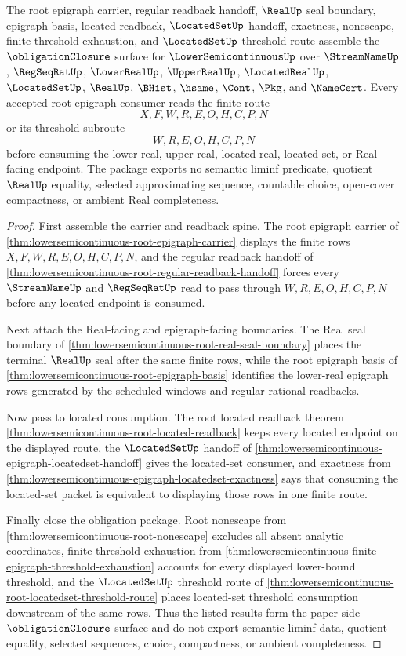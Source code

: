 \begin{theorem}
\label{thm:lowersemicontinuous-root-epigraph-closure-package}
The root epigraph carrier, regular readback handoff, $\RealUp$ seal boundary, epigraph basis, located readback, $\LocatedSetUp$ handoff, exactness, nonescape, finite threshold exhaustion, and $\LocatedSetUp$ threshold route assemble the $\obligationClosure$ surface for $\LowerSemicontinuousUp$ over $\StreamNameUp$, $\RegSeqRatUp$, $\LowerRealUp$, $\UpperRealUp$, $\LocatedRealUp$, $\LocatedSetUp$, $\RealUp$, $\BHist$, $\hsame$, $\Cont$, $\Pkg$, and $\NameCert$. Every accepted root epigraph consumer reads the finite route
$$
X,F,W,R,E,O,H,C,P,N
$$
or its threshold subroute
$$
W,R,E,O,H,C,P,N
$$
before consuming the lower-real, upper-real, located-real, located-set, or Real-facing endpoint. The package exports no semantic liminf predicate, quotient $\RealUp$ equality, selected approximating sequence, countable choice, open-cover compactness, or ambient Real completeness.
\end{theorem}
\begin{proof}
First assemble the carrier and readback spine. The root epigraph carrier of \autoref{thm:lowersemicontinuous-root-epigraph-carrier} displays the finite rows $X,F,W,R,E,O,H,C,P,N$, and the regular readback handoff of \autoref{thm:lowersemicontinuous-root-regular-readback-handoff} forces every $\StreamNameUp$ and $\RegSeqRatUp$ read to pass through $W,R,E,O,H,C,P,N$ before any located endpoint is consumed.

Next attach the Real-facing and epigraph-facing boundaries. The Real seal boundary of \autoref{thm:lowersemicontinuous-root-real-seal-boundary} places the terminal $\RealUp$ seal after the same finite rows, while the root epigraph basis of \autoref{thm:lowersemicontinuous-root-epigraph-basis} identifies the lower-real epigraph rows generated by the scheduled windows and regular rational readbacks.

Now pass to located consumption. The root located readback theorem \autoref{thm:lowersemicontinuous-root-located-readback} keeps every located endpoint on the displayed route, the $\LocatedSetUp$ handoff of \autoref{thm:lowersemicontinuous-epigraph-locatedset-handoff} gives the located-set consumer, and exactness from \autoref{thm:lowersemicontinuous-epigraph-locatedset-exactness} says that consuming the located-set packet is equivalent to displaying those rows in one finite route.

Finally close the obligation package. Root nonescape from \autoref{thm:lowersemicontinuous-root-nonescape} excludes all absent analytic coordinates, finite threshold exhaustion from \autoref{thm:lowersemicontinuous-finite-epigraph-threshold-exhaustion} accounts for every displayed lower-bound threshold, and the $\LocatedSetUp$ threshold route of \autoref{thm:lowersemicontinuous-root-locatedset-threshold-route} places located-set threshold consumption downstream of the same rows. Thus the listed results form the paper-side $\obligationClosure$ surface and do not export semantic liminf data, quotient equality, selected sequences, choice, compactness, or ambient completeness.
\end{proof}
